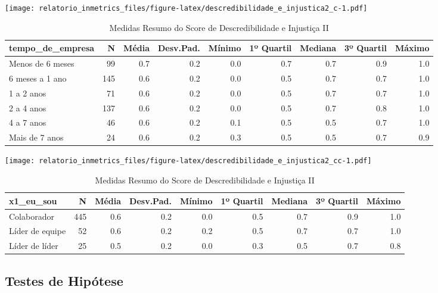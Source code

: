 \documentclass[]{book}
\begin{document}
\texttt{[image: relatorio\_inmetrics\_files/figure-latex/descredibilidade\_e\_injustica2\_c-1.pdf]}

\begin{table}[t]

\caption{\label{tab:unnamed-chunk-14}Medidas Resumo do Score de Descredibilidade e Injustiça II}
\centering
\fontsize{7}{9}\selectfont
\begin{tabular}{lrrrrrrrr}
\toprule
tempo\_de\_empresa & N & Média & Desv.Pad. & Mínimo & 1º Quartil & Mediana & 3º Quartil & Máximo\\
\midrule
Menos de 6 meses & 99 & 0.7 & 0.2 & 0.0 & 0.7 & 0.7 & 0.9 & 1.0\\
6 meses a 1 ano & 145 & 0.6 & 0.2 & 0.0 & 0.5 & 0.7 & 0.7 & 1.0\\
1 a 2 anos & 71 & 0.6 & 0.2 & 0.0 & 0.5 & 0.7 & 0.7 & 1.0\\
2 a 4 anos & 137 & 0.6 & 0.2 & 0.0 & 0.5 & 0.7 & 0.8 & 1.0\\
4 a 7 anos & 46 & 0.6 & 0.2 & 0.1 & 0.5 & 0.5 & 0.7 & 1.0\\
\addlinespace
Mais de 7 anos & 24 & 0.6 & 0.2 & 0.3 & 0.5 & 0.5 & 0.7 & 0.9\\
\bottomrule
\end{tabular}
\end{table}

\texttt{[image: relatorio\_inmetrics\_files/figure-latex/descredibilidade\_e\_injustica2\_cc-1.pdf]}

\begin{table}[t]

\caption{\label{tab:unnamed-chunk-15}Medidas Resumo do Score de Descredibilidade e Injustiça II}
\centering
\fontsize{7}{9}\selectfont
\begin{tabular}{lrrrrrrrr}
\toprule
x1\_eu\_sou & N & Média & Desv.Pad. & Mínimo & 1º Quartil & Mediana & 3º Quartil & Máximo\\
\midrule
Colaborador & 445 & 0.6 & 0.2 & 0.0 & 0.5 & 0.7 & 0.9 & 1.0\\
Líder de equipe & 52 & 0.6 & 0.2 & 0.2 & 0.5 & 0.7 & 0.7 & 1.0\\
Líder de líder & 25 & 0.5 & 0.2 & 0.0 & 0.3 & 0.5 & 0.7 & 0.8\\
\bottomrule
\end{tabular}
\end{table}

\pagebreak

\hypertarget{testes-de-hipotese-1}{%
\subsection{Testes de Hipótese}\label{testes-de-hipotese-1}}
\end{document}
